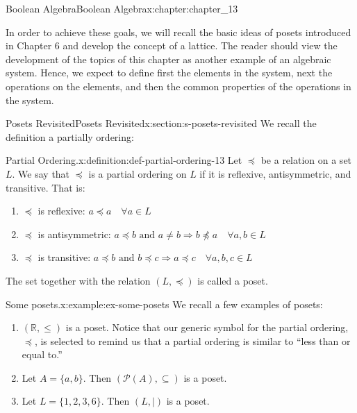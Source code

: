 \documentclass[oneside,10pt,]{book}
\numberwithin{equation}{section}
\begin{document}
\begin{chapterptx}{Boolean Algebra}{}{Boolean Algebra}{}{}{x:chapter:chapter_13}
\begin{introduction}{}
\par
In order to achieve these goals, we will recall the basic ideas of posets introduced in Chapter 6 and develop the concept of a lattice.  The reader should view the development of the topics of this chapter as another example of an algebraic system. Hence, we expect to define first the elements in the system, next the operations on the elements, and then the common properties of the operations in the system.%
\end{introduction}%
%
%
\typeout{************************************************}
\typeout{************************************************}
%
\begin{sectionptx}{Posets Revisited}{}{Posets Revisited}{}{}{x:section:s-posets-revisited}
%
We recall the definition a partially ordering:%
\begin{definition}{Partial Ordering.}{x:definition:def-partial-ordering-13}%
%
Let \(\preceq\) be a relation on a set \(L\).  We say that \(\preceq\) is a partial ordering on \(L\) if it is reflexive, antisymmetric, and transitive.  That is:%
\begin{enumerate}[label=(\arabic*)]
\item{}\(\preceq\) is reflexive: \(a \preceq a  \quad \forall a \in L\)%
\item{}\(\preceq\) is antisymmetric: \(a \preceq b \textrm{ and } a \neq b \Rightarrow b \npreceq a \quad \forall a,b \in L\)%
\item{}\(\preceq\) is transitive: \(a \preceq b \textrm{ and } b \preceq c \Rightarrow a \preceq c \quad \forall a,b,c \in L\)%
\end{enumerate}
The set together with the relation \((L, \preceq)\) is called a poset.%
\end{definition}
\begin{example}{Some posets.}{x:example:ex-some-posets}%
We recall a few examples of posets:%
\begin{enumerate}[label=(\alph*)]
\item{}\((\mathbb{R}, \leq)\) is a poset.  Notice that our generic symbol for the partial ordering, \(\preceq\), is selected to remind us that a partial ordering is similar to ``less than or equal to.''%
\item{}Let \(A=\{a,b\}\). Then \((\mathcal{P}(A) ,\subseteq)\) is a poset.%
\item{}Let \(L = \{1, 2, 3, 6\}\). Then  \((L,\mid)\) is a poset.%
\end{enumerate}

\end{example}
\end{sectionptx}
\end{chapterptx}
\end{document}
